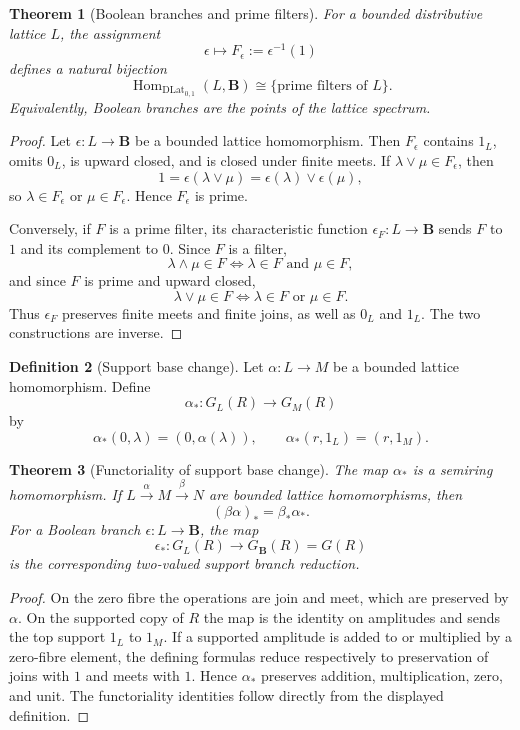 \documentclass[11pt]{amsart}
\numberwithin{equation}{section}
\newtheorem{theorem}{Theorem}[section]
\theoremstyle{definition}
\newtheorem{definition}[theorem]{Definition}
\newcommand{\B}{\mathbf B}
\newcommand{\Hom}{\operatorname{Hom}}
\begin{document}
\begin{theorem}[Boolean branches and prime filters]
\label{thm:boolean-branches-prime-filters}
For a bounded distributive lattice $L$, the assignment
\[
\epsilon\longmapsto F_\epsilon:=\epsilon^{-1}(1)
\]
defines a natural bijection
\[
\Hom_{\mathrm{DLat}_{0,1}}(L,\B)
\cong
\{\text{prime filters of }L\}.
\]
Equivalently, Boolean branches are the points of the lattice spectrum.
\end{theorem}

\begin{proof}
Let $\epsilon:L\to\B$ be a bounded lattice homomorphism.  Then
$F_\epsilon$ contains $1_L$, omits $0_L$, is upward closed, and is closed
under finite meets.  If $\lambda\vee\mu\in F_\epsilon$, then
\[
1=\epsilon(\lambda\vee\mu)
 =\epsilon(\lambda)\vee\epsilon(\mu),
\]
so $\lambda\in F_\epsilon$ or $\mu\in F_\epsilon$.  Hence
$F_\epsilon$ is prime.

Conversely, if $F$ is a prime filter, its characteristic function
$\epsilon_F:L\to\B$ sends $F$ to $1$ and its complement to $0$.  Since
$F$ is a filter,
\[
\lambda\wedge\mu\in F
\iff
\lambda\in F\text{ and }\mu\in F,
\]
and since $F$ is prime and upward closed,
\[
\lambda\vee\mu\in F
\iff
\lambda\in F\text{ or }\mu\in F.
\]
Thus $\epsilon_F$ preserves finite meets and finite joins, as well as
$0_L$ and $1_L$.  The two constructions are inverse.
\end{proof}

\begin{definition}[Support base change]
Let $\alpha:L\to M$ be a bounded lattice homomorphism.  Define
\[
\alpha_*:G_L(R)\longrightarrow G_M(R)
\]
by
\[
\alpha_*(0,\lambda)=(0,\alpha(\lambda)),
\qquad
\alpha_*(r,1_L)=(r,1_M).
\]
\end{definition}

\begin{theorem}[Functoriality of support base change]
\label{thm:support-base-change}
The map $\alpha_*$ is a semiring homomorphism.  If
$L\xrightarrow{\alpha}M\xrightarrow{\beta}N$ are bounded lattice
homomorphisms, then
\[
(\beta\alpha)_*=\beta_*\alpha_*.
\]
For a Boolean branch $\epsilon:L\to\B$, the map
\[
\epsilon_*:G_L(R)\longrightarrow G_{\B}(R)=G(R)
\]
is the corresponding two-valued support branch reduction.
\end{theorem}

\begin{proof}
On the zero fibre the operations are join and meet, which are preserved by
$\alpha$.  On the supported copy of $R$ the map is the identity on
amplitudes and sends the top support $1_L$ to $1_M$.  If a supported
amplitude is added to or multiplied by a zero-fibre element, the defining
formulas reduce respectively to preservation of joins with $1$ and meets
with $1$.  Hence $\alpha_*$ preserves addition, multiplication, zero, and
unit.  The functoriality identities follow directly from the displayed
definition.
\end{proof}
\end{document}
